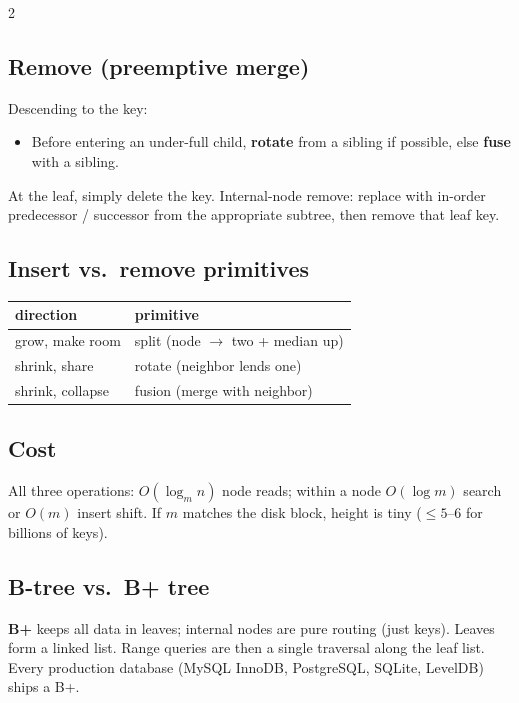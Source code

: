 \documentclass[10pt]{article}
\begin{document}
\begin{multicols}{2}
\subsection*{Remove (preemptive merge)}
Descending to the key:
\begin{itemize}
    \item Before entering an under-full child, \textbf{rotate} from a
    sibling if possible, else \textbf{fuse} with a sibling.
\end{itemize}
At the leaf, simply delete the key. Internal-node remove: replace
with in-order predecessor / successor from the appropriate subtree,
then remove that leaf key.

\subsection*{Insert vs.\ remove primitives}
\begin{tabular}{@{}l|l@{}}
\textbf{direction} & \textbf{primitive}\\
\hline
grow, make room    & split (node $\to$ two + median up)\\
shrink, share      & rotate (neighbor lends one)\\
shrink, collapse   & fusion (merge with neighbor)
\end{tabular}

\subsection*{Cost}
All three operations: $O(\log_m n)$ node reads; within a node
$O(\log m)$ search or $O(m)$ insert shift. If $m$ matches the disk
block, height is tiny ($\le 5$--6 for billions of keys).

\subsection*{B-tree vs.\ B+ tree}
\textbf{B+} keeps all data in leaves; internal nodes are pure
routing (just keys). Leaves form a linked list. Range queries are
then a single traversal along the leaf list. Every production
database (MySQL InnoDB, PostgreSQL, SQLite, LevelDB) ships a B+.


\end{multicols}
\end{document}
